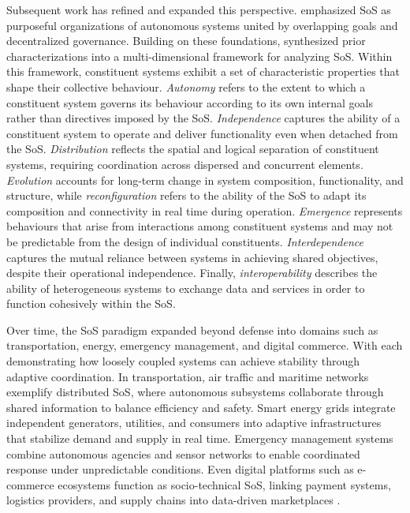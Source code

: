 Subsequent work has refined and expanded this perspective. \citet{boardman2006system} emphasized SoS as purposeful organizations of autonomous systems united by overlapping goals and decentralized governance. 
Building on these foundations, \citet{nielsen2015systems} synthesized prior characterizations into a multi-dimensional framework for analyzing SoS. Within this framework, constituent systems exhibit a set of characteristic properties that shape their collective behaviour. \textit{Autonomy} refers to the extent to which a constituent system governs its behaviour according to its own internal goals rather than directives imposed by the SoS. \textit{Independence} captures the ability of a constituent system to operate and deliver functionality even when detached from the SoS. \textit{Distribution} reflects the spatial and logical separation of constituent systems, requiring coordination across dispersed and concurrent elements. \textit{Evolution} accounts for long-term change in system composition, functionality, and structure, while \textit{reconfiguration} refers to the ability of the SoS to adapt its composition and connectivity in real time during operation. \textit{Emergence} represents behaviours that arise from interactions among constituent systems and may not be predictable from the design of individual constituents. \textit{Interdependence} captures the mutual reliance between systems in achieving shared objectives, despite their operational independence. Finally, \textit{interoperability} describes the ability of heterogeneous systems to exchange data and services in order to function cohesively within the SoS.

Over time, the SoS paradigm expanded beyond defense into domains such as transportation, energy, emergency management, and digital commerce. With each demonstrating how loosely coupled systems can achieve stability through adaptive coordination. In transportation, air traffic and maritime networks exemplify distributed SoS, where autonomous subsystems collaborate through shared information to balance efficiency and safety. Smart energy grids integrate independent generators, utilities, and consumers into adaptive infrastructures that stabilize demand and supply in real time. Emergency management systems combine autonomous agencies and sensor networks to enable coordinated response under unpredictable conditions. Even digital platforms such as e-commerce ecosystems function as socio-technical SoS, linking payment systems, logistics providers, and supply chains into data-driven marketplaces \cite{nielsen2015systems}.


